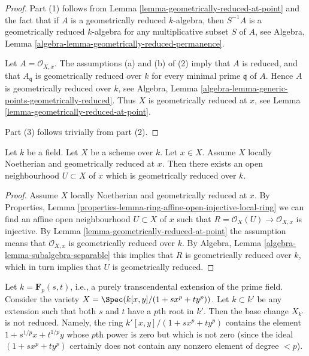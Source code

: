 \begin{proof}
Part (1) follows from
Lemma \ref{lemma-geometrically-reduced-at-point}
and the fact that if $A$ is a geometrically reduced
$k$-algebra, then $S^{-1}A$ is a geometrically reduced $k$-algebra for
any multiplicative subset $S$ of $A$, see
Algebra, Lemma \ref{algebra-lemma-geometrically-reduced-permanence}.

\medskip\noindent
Let $A = \mathcal{O}_{X, x}$. The assumptions (a) and (b) of (2) imply
that $A$ is reduced, and that $A_{\mathfrak q}$ is geometrically
reduced over $k$ for every minimal prime $\mathfrak q$ of $A$.
Hence $A$ is geometrically reduced over $k$, see
Algebra, Lemma \ref{algebra-lemma-generic-points-geometrically-reduced}.
Thus $X$ is geometrically reduced at $x$, see
Lemma \ref{lemma-geometrically-reduced-at-point}.

\medskip\noindent
Part (3) follows trivially from part (2).
\end{proof}

\begin{lemma}
\label{lemma-Noetherian-geometrically-reduced-at-point}
Let $k$ be a field.
Let $X$ be a scheme over $k$.
Let $x \in X$.
Assume $X$ locally Noetherian and geometrically reduced at $x$.
Then there exists an open neighbourhood $U \subset X$ of $x$
which is geometrically reduced over $k$.
\end{lemma}

\begin{proof}
Assume $X$ locally Noetherian and geometrically reduced at $x$.
By Properties, Lemma
\ref{properties-lemma-ring-affine-open-injective-local-ring}
we can find an affine open neighbourhood $U \subset X$ of $x$ such that
$R = \mathcal{O}_X(U) \to \mathcal{O}_{X, x}$
is injective. By
Lemma \ref{lemma-geometrically-reduced-at-point} the assumption
means that $\mathcal{O}_{X, x}$ is geometrically reduced over $k$.
By Algebra, Lemma \ref{algebra-lemma-subalgebra-separable}
this implies that $R$ is geometrically reduced over $k$, which
in turn implies that $U$ is geometrically reduced.
\end{proof}

\begin{example}
\label{example-not-geometrically-reduced}
Let $k = \mathbf{F}_p(s, t)$, i.e., a purely transcendental extension
of the prime field. Consider the variety
$X = \Spec(k[x, y]/(1 + sx^p + ty^p))$.
Let $k \subset k'$ be any extension such that
both $s$ and $t$ have a $p$th root in $k'$.
Then the base change $X_{k'}$ is not reduced.
Namely, the ring $k'[x, y]/(1 + s x^p + ty^p)$ contains the element
$1 + s^{1/p}x + t^{1/p}y$ whose $p$th power is zero but
which is not zero (since the ideal $(1 + sx^p + ty^p)$ certainly
does not contain any nonzero element of degree $< p$).
\end{example}

